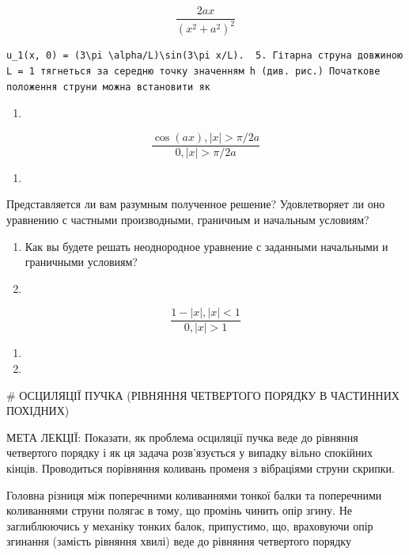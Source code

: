 \documentclass[
  ukrainian,
]{article}
\providecommand{\tightlist}{%
  \setlength{\itemsep}{0pt}\setlength{\parskip}{0pt}}
\begin{document}
\[
\frac{2ax}{(x^2+a^2)^2}
\]

\begin{verbatim}
u_1(x, 0) = (3\pi \alpha/L)\sin(3\pi x/L).  5. Гітарна струна довжиною L = 1 тягнеться за середню точку значенням h (див. рис.) Початкове положення струни можна встановити як
\end{verbatim}

\begin{enumerate}
\def\labelenumi{\arabic{enumi}.}
\setcounter{enumi}{13}
\tightlist
\item
\end{enumerate}

\[
\frac{\cos(ax), |x| > \pi/2a}{0, |x| > \pi/2a}
\]

\begin{enumerate}
\def\labelenumi{\arabic{enumi}.}
\setcounter{enumi}{15}
\tightlist
\item
\end{enumerate}

Представляется ли вам разумным полученное решение? Удовлетворяет ли оно
уравнению с частными производными, граничным и начальным условиям?

\begin{enumerate}
\def\labelenumi{\arabic{enumi}.}
\setcounter{enumi}{6}
\item
  Как вы будете решать неоднородное уравнение с заданными начальными и
  граничными условиям?
\item
\end{enumerate}

\[
\frac{1-|x|, |x| < 1}{0, |x| > 1}
\]

\begin{enumerate}
\def\labelenumi{\arabic{enumi}.}
\setcounter{enumi}{18}
\tightlist
\item
\item
\end{enumerate}

\# ОСЦИЛЯЦІЇ ПУЧКА (РІВНЯННЯ ЧЕТВЕРТОГО ПОРЯДКУ В ЧАСТИННИХ ПОХІДНИХ)

МЕТА ЛЕКЦІЇ: Показати, як проблема осциляції пучка веде до рівняння
четвертого порядку і як ця задача розв'язується у випадку вільно
спокійних кінців. Проводиться порівняння коливань променя з вібраціями
струни скрипки.

Головна різниця між поперечними коливаннями тонкої балки та поперечними
коливаннями струни полягає в тому, що промінь чинить опір згину. Не
заглиблюючись у механіку тонких балок, припустимо, що, враховуючи опір
згинання (замість рівняння хвилі) веде до рівняння четвертого порядку
\end{document}
